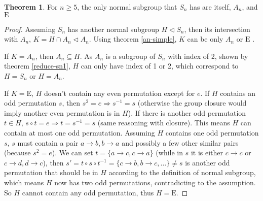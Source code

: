 \documentclass[]{article}
\theoremstyle{definition}\newtheorem{theorem}{Theorem}
\begin{document}
\begin{theorem}
	\label{reduce-sn2}
	For $n \ge 5$, the only normal subgroup that $S_n$ has are itself, $A_n$, and $\mathrm{E}$
\end{theorem}
\begin{proof}
	Assuming $S_n$ has another normal subgroup $H \triangleleft S_n$, then its intersection with $A_n$, $K = H \cap A_n \triangleleft A_n$. Using theorem \ref{an-simple}, $K$ can be only $A_n$ or $\mathrm{E}$ .
	
	If $K = A_n$, then $A_n \subseteq H$. As $A_n$ is a subgroup of $S_n$ with index of 2, shown by theorem \ref{reduce-sn1}, $H$ can only have index of 1 or 2, which correspond to $H = S_n$ or $H = A_n$.
	
	If $K = \mathrm{E}$, $H$ doesn't contain any even permutation except for $e$. If $H$ contains an odd permutation $s$, then $s^2 = e \Rightarrow s^{-1} = s$ (otherwise the group closure would imply another even permutation is in $H$). If there is another odd permutation $t\in H$, $s\circ t= e \Rightarrow t = s^{-1} = s$ (same reasoning with closure). This means $H$ can contain at most one odd permutation. Assuming $H$ contains one odd permutation $s$, $s$ must contain a pair $a\rightarrow b, b\rightarrow a$ and possibly a few other similar pairs (because $s^2=e$). We can set $t = \{a\rightarrow c, c\rightarrow a\}$ (while in $s$ it is either $c\rightarrow c$ or $c\rightarrow d,d \rightarrow c$), then $s'=t\circ s\circ t^{-1} = \{c\rightarrow b, b\rightarrow c,\dots\}\neq s$ is another odd permutation that should be in $H$ according to the definition of normal subgroup, which means $H$ now has two odd permutations, contradicting to the assumption. So $H$ cannot contain any odd permutation, thus $H = \mathrm{E}$.
\end{proof}
\end{document}
